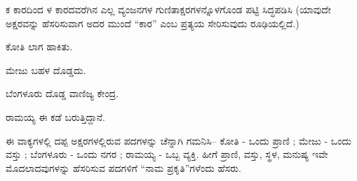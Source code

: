 \vspace{2.5pt plus 3pt minus 0.5pt}\noindent\hspace*{1.2em}\hspace{0.55em}ಕ ಕಾರದಿಂದ ಳ ಕಾರದವರೆಗಿನ ಎಲ್ಲ ವ್ಯಂಜನಗಳ ಗುಣಿತಾಕ್ಷರಗಳನ್ನೊಳಗೊಂಡ ಪಟ್ಟಿ ಸಿದ್ಧಪಡಿಸಿ (ಯಾವುದೇ ಅಕ್ಷರವನ್ನು ಹೆಸರಿಸುವಾಗ ಅದರ ಮುಂದೆ “ಕಾರ” ಎಂಬ ಪ್ರತ್ಯಯ ಸೇರಿಸುವುದು ರೂಢಿಯಲ್ಲಿದೆ.)\par


\noindent\hspace*{2.2em}ಕೋತಿ ಲಾಗ ಹಾಕಿತು.\par

\noindent\hspace*{2.2em}ಮೇಜು ಬಹಳ ದೊಡ್ಡದು.\par

\noindent\hspace*{2.2em}ಬೆಂಗಳೂರು ದೊಡ್ಡ ವಾಣಿಜ್ಯ ಕೇಂದ್ರ.\par

\noindent\hspace*{2.2em}ರಾಮಯ್ಯ ಈ ಕಡೆ ಬರುತ್ತಿದ್ದಾನೆ.\par

\indent ಈ ವಾಕ್ಯಗಳಲ್ಲಿ ದಪ್ಪ ಅಕ್ಷರಗಳಲ್ಲಿರುವ ಪದಗಳನ್ನು ಚೆನ್ನಾಗಿ ಗಮನಿಸಿ-- ಕೋತಿ - ಒಂದು ಪ್ರಾಣಿ ; ಮೇಜು - ಒಂದು ವಸ್ತು ; ಬೆಂಗಳೂರು - ಒಂದು  ನಗರ ; ರಾಮಯ್ಯ - ಒಬ್ಬ ವ್ಯಕ್ತಿ. ಹೀಗೆ ಪ್ರಾಣಿ, ವಸ್ತು, ಸ್ಥಳ, ಮನುಷ್ಯ ಇವೇ ಮೊದಲಾದವುಗಳನ್ನು ಹೆಸರಿಸುವ ಪದಗಳಿಗೆ “ನಾಮ ಪ್ರಕೃತಿ”ಗಳೆಂದು  ಹೆಸರು.\par
